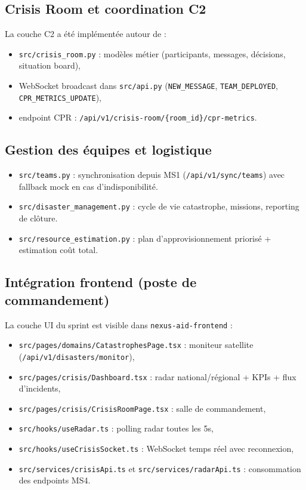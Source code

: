 \subsection{Crisis Room et coordination C2}
La couche C2 a \'et\'e impl\'ement\'ee autour de :
\begin{itemize}
    \item \texttt{src/crisis\_room.py} : mod\`eles m\'etier (participants, messages, d\'ecisions, situation board),
    \item WebSocket broadcast dans \texttt{src/api.py} (\texttt{NEW\_MESSAGE}, \texttt{TEAM\_DEPLOYED}, \texttt{CPR\_METRICS\_UPDATE}),
    \item endpoint CPR : \texttt{/api/v1/crisis-room/\{room\_id\}/cpr-metrics}.
\end{itemize}

\subsection{Gestion des \'equipes et logistique}
\begin{itemize}
    \item \texttt{src/teams.py} : synchronisation depuis MS1 (\texttt{/api/v1/sync/teams}) avec fallback mock en cas d'indisponibilit\'e.
    \item \texttt{src/disaster\_management.py} : cycle de vie catastrophe, missions, reporting de cl\^oture.
    \item \texttt{src/resource\_estimation.py} : plan d'approvisionnement prioris\'e + estimation co\^ut total.
\end{itemize}

\subsection{Int\'egration frontend (poste de commandement)}
La couche UI du sprint est visible dans \texttt{nexus-aid-frontend} :
\begin{itemize}
    \item \texttt{src/pages/domains/CatastrophesPage.tsx} : moniteur satellite (\texttt{/api/v1/disasters/monitor}),
    \item \texttt{src/pages/crisis/Dashboard.tsx} : radar national/r\'egional + KPIs + flux d'incidents,
    \item \texttt{src/pages/crisis/CrisisRoomPage.tsx} : salle de commandement,
    \item \texttt{src/hooks/useRadar.ts} : polling radar toutes les 5s,
    \item \texttt{src/hooks/useCrisisSocket.ts} : WebSocket temps r\'eel avec reconnexion,
    \item \texttt{src/services/crisisApi.ts} et \texttt{src/services/radarApi.ts} : consommation des endpoints MS4.
\end{itemize}

